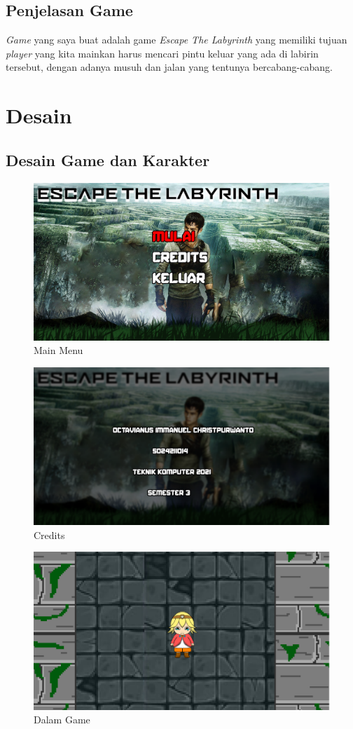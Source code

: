 \documentclass[oneside, a4paper ,12pt]{book}
\begin{document}
 \section{Penjelasan Game}
 
 \emph{Game} yang saya buat adalah game \emph{Escape The Labyrinth} yang memiliki tujuan \emph{player} yang kita mainkan harus mencari pintu keluar yang ada di labirin tersebut, dengan adanya musuh dan jalan yang tentunya bercabang-cabang.
 
 \chapter{Desain}
 \section{Desain Game dan Karakter}
 \begin{figure} [h]
 		\centering
 		\includegraphics[width=10 cm]{Main Menu.png}
 		\caption{Main Menu}
 \end{figure}
 \begin{figure} [h]
 		\centering
 		\includegraphics[width=10 cm]{Credits.png}
 		\caption{Credits}
 \end{figure}
 \begin{figure} [h]
 		\centering
 		\includegraphics[width=10 cm]{Ingame.png}
 		\caption{Dalam Game}
\end{figure}
\end{document}

